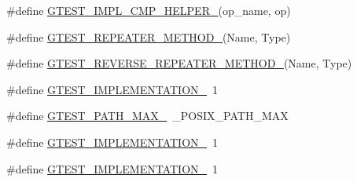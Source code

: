\begin{DoxyCompactItemize}
\item 
\#define \hyperlink{fused-src_2gtest_2gtest-all_8cc_a4a5b6fbde5dd05e05dd6846ac5e5c18e}{G\-T\-E\-S\-T\-\_\-\-I\-M\-P\-L\-\_\-\-C\-M\-P\-\_\-\-H\-E\-L\-P\-E\-R\-\_\-}(op\-\_\-name, op)
\item 
\#define \hyperlink{fused-src_2gtest_2gtest-all_8cc_a87a475ab9e81de8b49525787665b9229}{G\-T\-E\-S\-T\-\_\-\-R\-E\-P\-E\-A\-T\-E\-R\-\_\-\-M\-E\-T\-H\-O\-D\-\_\-}(Name, Type)
\item 
\#define \hyperlink{fused-src_2gtest_2gtest-all_8cc_aa7da32fd7da6a8cceeed6b448cb7b5f2}{G\-T\-E\-S\-T\-\_\-\-R\-E\-V\-E\-R\-S\-E\-\_\-\-R\-E\-P\-E\-A\-T\-E\-R\-\_\-\-M\-E\-T\-H\-O\-D\-\_\-}(Name, Type)
\item 
\#define \hyperlink{fused-src_2gtest_2gtest-all_8cc_a83bd232fd1077579fada92c31bb7469f}{G\-T\-E\-S\-T\-\_\-\-I\-M\-P\-L\-E\-M\-E\-N\-T\-A\-T\-I\-O\-N\-\_\-}~1
\item 
\#define \hyperlink{fused-src_2gtest_2gtest-all_8cc_ad9d445747785a9271a57cf1d392b89ad}{G\-T\-E\-S\-T\-\_\-\-P\-A\-T\-H\-\_\-\-M\-A\-X\-\_\-}~\-\_\-\-P\-O\-S\-I\-X\-\_\-\-P\-A\-T\-H\-\_\-\-M\-A\-X
\item 
\#define \hyperlink{fused-src_2gtest_2gtest-all_8cc_a83bd232fd1077579fada92c31bb7469f}{G\-T\-E\-S\-T\-\_\-\-I\-M\-P\-L\-E\-M\-E\-N\-T\-A\-T\-I\-O\-N\-\_\-}~1
\item 
\#define \hyperlink{fused-src_2gtest_2gtest-all_8cc_a83bd232fd1077579fada92c31bb7469f}{G\-T\-E\-S\-T\-\_\-\-I\-M\-P\-L\-E\-M\-E\-N\-T\-A\-T\-I\-O\-N\-\_\-}~1
\end{DoxyCompactItemize}
